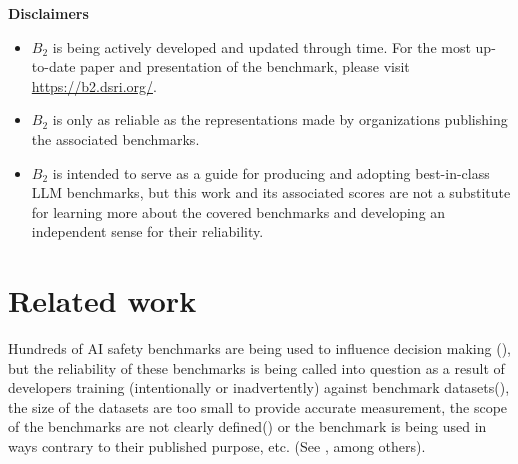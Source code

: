 \documentclass{article}
\newcommand\bb{$B_2$ }
\begin{document}
\begin{center}
    \begin{tcolorbox}[colback=blue!10, colframe=blue!50, width=\textwidth, boxrule=0.5mm, sharp corners, coltext=black, halign=left]
\textbf{Disclaimers}
\begin{itemize}
\item \bb is being actively developed and updated through time. For the most up-to-date paper and presentation of the benchmark, please visit \url{https://b2.dsri.org/}.
\item \bb is only as reliable as the representations made by organizations publishing the associated benchmarks.
\item \bb is intended to serve as a guide for producing and adopting best-in-class LLM benchmarks, but this work and its associated scores are not a substitute for learning more about the covered benchmarks and developing an independent sense for their reliability.
\end{itemize}
    \end{tcolorbox}
\end{center}

\section{Related work}


Hundreds of AI safety benchmarks are being used to influence decision making (\cite{rottger2024safetyprompts,bommasani2024foundation}), but the reliability of these benchmarks is being called into question as a result of developers training (intentionally or inadvertently) against benchmark datasets(\cite{li2024opensourcedatacontamination,magar-schwartz-2022-data,zhou2023dontmakellmevaluation,balloccu2024leak}), the size of the datasets are too small to provide accurate measurement, the scope of the benchmarks are not clearly defined(\cite{raji2021ai}) or the benchmark is being used in ways contrary to their published purpose, etc. (See \cite{liao2023rethinking,mcintosh2024inadequacies,banerjee2024vulnerability,nytimesAIMeasurement,hardy2024more,themarkupEveryoneJudging,anthropicChallengesEvaluating}, among others).
\end{document}
